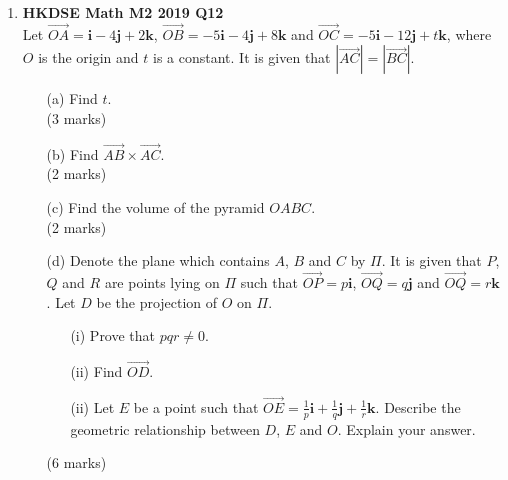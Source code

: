 \documentclass{report}
\begin{document}
\begin{enumerate}
	\item \textbf{HKDSE Math M2 2019 Q12}\\
	Let $\overrightarrow{OA} = \textbf{i} -4 \textbf{j}+ 2\textbf {k}$, $\overrightarrow{OB} = -5\textbf{i} -4 \textbf{j} +8\textbf {k}$ and $\overrightarrow{OC} = -5\textbf{i} -12 \textbf{j} +t\textbf {k}$, where $O$ is the origin and $t$ is a constant. It is given that $|\overrightarrow{AC}| = |\overrightarrow{BC}|$. 
	\begin{enumerate}
		\item [(a)]Find $t$. \\(3 marks)
		\item [(b)]Find $\overrightarrow{AB} \times \overrightarrow{AC}$. \\(2 marks)
		\item [(c)]Find the volume of the pyramid $OABC$. \\(2 marks)
		\item [(d)]Denote the plane which contains $A$, $B$ and $C$ by $\Pi$. It is given that $P$, $Q$ and $R$ are points lying on $\Pi$ such that $\overrightarrow{OP} = p\textbf{i}$, $\overrightarrow{OQ} = q\textbf{j}$ and $\overrightarrow{OQ} = r\textbf{k}$. Let $D$ be the projection of $O$ on $\Pi$.
		\begin{enumerate}
			\item [(i)]Prove that $pqr \neq 0$. 
			\item [(ii)]Find $\overrightarrow{OD}$. 
			\item [(ii)]Let $E$ be a point such that $\overrightarrow{OE} = \displaystyle\frac{1}{p}\textbf{i}+\frac{1}{q}\textbf{j}+\frac{1}{r}\textbf{k}$. Describe the geometric relationship between $D$, $E$ and $O$. Explain your answer.
		\end{enumerate}
		(6 marks)
	\end{enumerate}


\end{enumerate}
\end{document}
